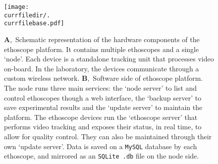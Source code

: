 \begin{figure}[h!]
  \centering   
    \texttt{[image: \\currfiledir/.\\currfilebase.pdf]}
  \caption[The ethoscope platform]{
  	\textbf{A},~Schematic representation of the hardware components of the ethoscope platform.
  	It contains multiple ethoscopes and a single `node'.
  	Each device is a standalone tracking unit that processes video on-board. 
  	In the laboratory, the devices communicate through a custom wireless network.
	\textbf{B},~Software side of ethoscope platform.
	The node runs three main services: 
	the `node server' to list and control ethoscopes though a web interface,
	the  `backup server' to save experimental results and 
	the `update server' to maintain the platform.
	The ethoscope devices run the `ethoscope server' that performs video tracking and exposes their status, in real time, to allow for quality control.
	They can also be maintained through their own `update server'.
	Data is saved on a \texttt{MySQL} database by each ethoscope, and mirrored as an \texttt{SQLite .db} file on the node side.
  \label{fig:\currfilebase}
  }
\end{figure}





